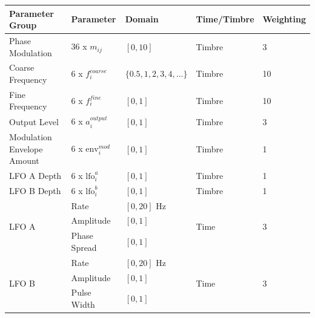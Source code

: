 \documentclass[11pt, oneside]{report}   	%
\begin{document}
\def\arraystretch{1.5}
\begin{table}[]
	\hspace{-2em}
	\begin{tabular}{|l|l|l|l|l|}
		\hline
		\textbf{Parameter Group}                	 & \textbf{Parameter}     & \textbf{Domain}            & \textbf{Time/Timbre} & \textbf{Weighting} \\ \hline
		Phase Modulation         						& 36 x $m_{ij}$               & $[0, 10]$                  		& Timbre                	& 3									\\ \hline
		Coarse Frequency                            	& 6 x $f_{i}^{coarse}$     & $\{0.5, 1, 2, 3, 4, ...\}$ & Timbre                	& 10									  \\ \hline
		Fine Frequency                                 	   & 6 x $f_{i}^{fine}$         & $[0, 1]$                   		& Timbre                	& 10									  \\ \hline
		Output Level                                  		& 6 x $a_{i}^{output}$     & $[0, 1]$                   	  & Timbre                	& 3								    	\\ \hline
Modulation Envelope Amount                       & 6 x $\mathrm{env}_{i}^{mod}$   & $[0, 1]$                   	     & Timbre                  & 1		  \\ \hline
		LFO A Depth                                    		& 6 x $\mathrm{lfo}_{i}^{a}$         & $[0, 1]$                   	   & Timbre                  & 1				\\ \hline
		LFO B Depth                                    		& 6 x $\mathrm{lfo}_{i}^{b}$        & $[0, 1]$                   	   & Timbre                  & 1				\\ \hline
		\multirow{3}{*}{LFO A}      					& Rate                    		& $[0, 20]$ Hz               	 & \multirow{3}{*}{Time}& \multirow{3}{*}{3} \\
																	  & Amplitude               	& $[0, 1]$                   		&                      				& \\
																	  & Phase Spread         	& $[0, 1]$                   		&                       			&\\ \hline
		\multirow{3}{*}{LFO B}      					& Rate                    		& $[0, 20]$ Hz               	& \multirow{3}{*}{Time}& \multirow{3}{*}{3} \\
																	  & Amplitude               	& $[0, 1]$                   		&                       			&\\
																	  & Pulse Width                & $[0, 1]$                   		&                       			&\\ \hline

\end{tabular}
\end{table}
\end{document}
